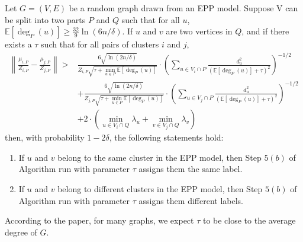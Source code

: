 {	\begin{theorem}
		Let $G=(V, E)$ be a random graph drawn from an EPP model. Suppose V can be split into two parts $P$ and $Q$ such that for all $u$, $\mathbb{E}\left[\operatorname{deg}_{P}(u)\right] \geq \frac{32}{9} \ln (6 n / \delta)$. If $u$ and $v$ are two vertices in $Q$, and if there exists a $\tau$ such that for all pairs of clusters $i$ and $j$,
			$$
			\begin{aligned}
			\left\|\frac{\mu_{i, P}}{Z_{i, P}}-\frac{\mu_{j, P}}{Z_{j, P}}\right\|>& \frac{6 \sqrt{\ln (2 n / \delta)}}{Z_{i, P} \sqrt{\tau+\min _{u \in P} \mathbb{E}\left[\operatorname{deg}_{P}(u)\right]}} \cdot\left(\sum_{u \in V_{i} \cap P} \frac{d_{u}^{2}}{\left(\mathbb{E}\left[\operatorname{deg}_{P}(u)\right]+\tau\right)^{2}}\right)^{-1 / 2} \\
			&+\frac{6 \sqrt{\ln (2 n / \delta)}}{Z_{j, P} \sqrt{\tau+\min _{u \in P} \mathbb{E}\left[\operatorname{deg}_{P}(u)\right]}} \cdot\left(\sum_{u \in V_{j} \cap P} \frac{d_{u}^{2}}{\left(\mathbb{E}\left[\operatorname{deg}_{P}(u)\right]+\tau\right)^{2}}\right)^{-1 / 2} \\
			&+2 \cdot\left(\min _{u \in V_{i} \cap Q} \lambda_{u}+\min _{v \in V_{j} \cap Q} \lambda_{v}\right)
			\end{aligned}
			$$
		then, with probability $1-2 \delta$, the following statements hold:
		\begin{enumerate}
			\item If $u$ and $v$ belong to the same cluster in the EPP model, then Step $5(b)$ of Algorithm run with parameter $\tau$ assigns them the same label.
			\item If $u$ and $v$ belong to different clusters in the EPP model, then Step $5(b)$ of Algorithm run with parameter $\tau$ assigns them different labels.
		\end{enumerate}
	\end{theorem}
	
	According to the paper, for many graphs, we expect $\tau$ to be close to the average degree of $G$.
	
}
